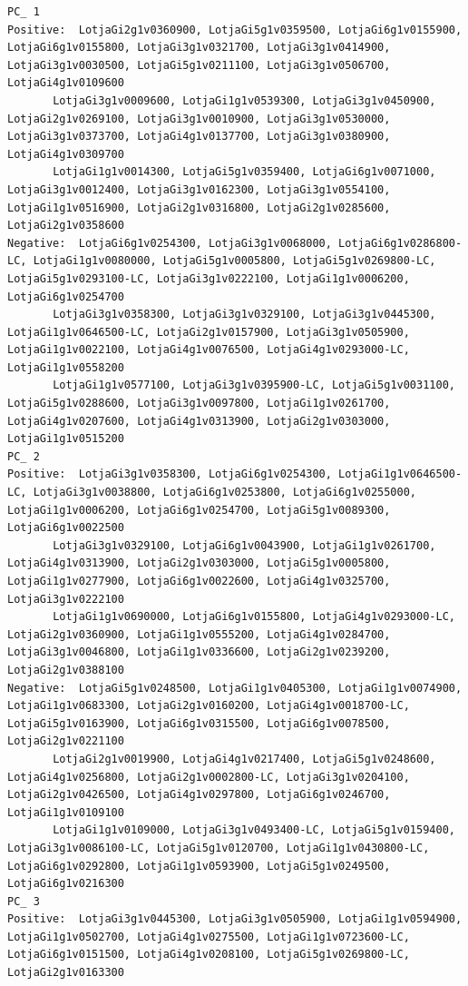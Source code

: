 \documentclass[
  letterpaper,
  DIV=11,
  numbers=noendperiod]{scrartcl}
\begin{document}
\begin{verbatim}
PC_ 1 
Positive:  LotjaGi2g1v0360900, LotjaGi5g1v0359500, LotjaGi6g1v0155900, LotjaGi6g1v0155800, LotjaGi3g1v0321700, LotjaGi3g1v0414900, LotjaGi3g1v0030500, LotjaGi5g1v0211100, LotjaGi3g1v0506700, LotjaGi4g1v0109600 
       LotjaGi3g1v0009600, LotjaGi1g1v0539300, LotjaGi3g1v0450900, LotjaGi2g1v0269100, LotjaGi3g1v0010900, LotjaGi3g1v0530000, LotjaGi3g1v0373700, LotjaGi4g1v0137700, LotjaGi3g1v0380900, LotjaGi4g1v0309700 
       LotjaGi1g1v0014300, LotjaGi5g1v0359400, LotjaGi6g1v0071000, LotjaGi3g1v0012400, LotjaGi3g1v0162300, LotjaGi3g1v0554100, LotjaGi1g1v0516900, LotjaGi2g1v0316800, LotjaGi2g1v0285600, LotjaGi2g1v0358600 
Negative:  LotjaGi6g1v0254300, LotjaGi3g1v0068000, LotjaGi6g1v0286800-LC, LotjaGi1g1v0080000, LotjaGi5g1v0005800, LotjaGi5g1v0269800-LC, LotjaGi5g1v0293100-LC, LotjaGi3g1v0222100, LotjaGi1g1v0006200, LotjaGi6g1v0254700 
       LotjaGi3g1v0358300, LotjaGi3g1v0329100, LotjaGi3g1v0445300, LotjaGi1g1v0646500-LC, LotjaGi2g1v0157900, LotjaGi3g1v0505900, LotjaGi1g1v0022100, LotjaGi4g1v0076500, LotjaGi4g1v0293000-LC, LotjaGi1g1v0558200 
       LotjaGi1g1v0577100, LotjaGi3g1v0395900-LC, LotjaGi5g1v0031100, LotjaGi5g1v0288600, LotjaGi3g1v0097800, LotjaGi1g1v0261700, LotjaGi4g1v0207600, LotjaGi4g1v0313900, LotjaGi2g1v0303000, LotjaGi1g1v0515200 
PC_ 2 
Positive:  LotjaGi3g1v0358300, LotjaGi6g1v0254300, LotjaGi1g1v0646500-LC, LotjaGi3g1v0038800, LotjaGi6g1v0253800, LotjaGi6g1v0255000, LotjaGi1g1v0006200, LotjaGi6g1v0254700, LotjaGi5g1v0089300, LotjaGi6g1v0022500 
       LotjaGi3g1v0329100, LotjaGi6g1v0043900, LotjaGi1g1v0261700, LotjaGi4g1v0313900, LotjaGi2g1v0303000, LotjaGi5g1v0005800, LotjaGi1g1v0277900, LotjaGi6g1v0022600, LotjaGi4g1v0325700, LotjaGi3g1v0222100 
       LotjaGi1g1v0690000, LotjaGi6g1v0155800, LotjaGi4g1v0293000-LC, LotjaGi2g1v0360900, LotjaGi1g1v0555200, LotjaGi4g1v0284700, LotjaGi3g1v0046800, LotjaGi1g1v0336600, LotjaGi2g1v0239200, LotjaGi2g1v0388100 
Negative:  LotjaGi5g1v0248500, LotjaGi1g1v0405300, LotjaGi1g1v0074900, LotjaGi1g1v0683300, LotjaGi2g1v0160200, LotjaGi4g1v0018700-LC, LotjaGi5g1v0163900, LotjaGi6g1v0315500, LotjaGi6g1v0078500, LotjaGi2g1v0221100 
       LotjaGi2g1v0019900, LotjaGi4g1v0217400, LotjaGi5g1v0248600, LotjaGi4g1v0256800, LotjaGi2g1v0002800-LC, LotjaGi3g1v0204100, LotjaGi2g1v0426500, LotjaGi4g1v0297800, LotjaGi6g1v0246700, LotjaGi1g1v0109100 
       LotjaGi1g1v0109000, LotjaGi3g1v0493400-LC, LotjaGi5g1v0159400, LotjaGi3g1v0086100-LC, LotjaGi5g1v0120700, LotjaGi1g1v0430800-LC, LotjaGi6g1v0292800, LotjaGi1g1v0593900, LotjaGi5g1v0249500, LotjaGi6g1v0216300 
PC_ 3 
Positive:  LotjaGi3g1v0445300, LotjaGi3g1v0505900, LotjaGi1g1v0594900, LotjaGi1g1v0502700, LotjaGi4g1v0275500, LotjaGi1g1v0723600-LC, LotjaGi6g1v0151500, LotjaGi4g1v0208100, LotjaGi5g1v0269800-LC, LotjaGi2g1v0163300 

\end{verbatim}
\end{document}
